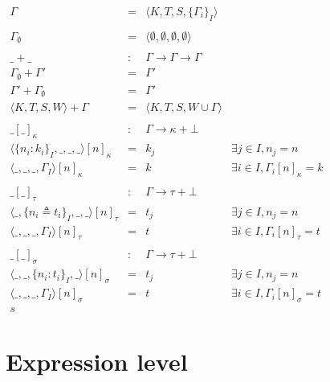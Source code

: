 \documentclass{article}[11pt]
\begin{document}
    \begin{math}
        \begin{array}{rcll}
            \Gamma  & =   & \langle K, T, S, \{ \Gamma_i \}_I \rangle        \\
            \\
            \Gamma_\emptyset & = & \langle \emptyset, \emptyset, \emptyset, \emptyset \rangle \\
            \\
            \_+\_         & : & \Gamma \rightarrow \Gamma \rightarrow \Gamma \\
            \Gamma_\emptyset + \Gamma' & = & \Gamma'    \\
            \Gamma' + \Gamma_\emptyset & = & \Gamma' \\
            \langle K, T, S, W \rangle + \Gamma & =& \langle K, T, S, W \cup \Gamma \rangle \\
            \\
            \_[\_]_\kappa & : & \Gamma \rightarrow \kappa + \bot \\
            \langle \{n_i:k_i\}_I, \_, \_, \_\rangle[n]_\kappa & = & k_j & \exists j \in I, n_j = n \\
            \langle \_, \_, \_, \Gamma_I\rangle[n]_\kappa & = & k & \exists i \in I, \Gamma_i[n]_\kappa = k \\
            \\
            \_[\_]_\tau & : & \Gamma \rightarrow \tau + \bot \\
            \langle \_, \{n_i \triangleq t_i\}_I, \_, \_\rangle[n]_\tau & = & t_j & \exists j \in I, n_j = n \\
            \langle \_, \_, \_, \Gamma_I\rangle[n]_\tau & = & t & \exists i \in I, \Gamma_i[n]_\tau = t \\
            \\
            \_[\_]_\sigma & : & \Gamma \rightarrow \tau + \bot \\
            \langle \_, \_, \{n_i:t_i\}_I, \_\rangle[n]_\sigma & = & t_j & \exists j \in I, n_j = n \\
            \langle \_, \_, \_, \Gamma_I\rangle[n]_\sigma & = & t & \exists i \in I, \Gamma_i[n]_\sigma = t \\s
        \end{array}
    \end{math}


    \section{Expression level}\label{sec:expression-level}
\end{document}
